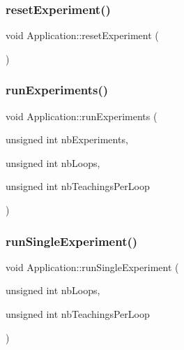 \subsubsection{\texorpdfstring{reset\+Experiment()}{resetExperiment()}}
{\footnotesize\ttfamily void Application\+::reset\+Experiment (\begin{DoxyParamCaption}{ }\end{DoxyParamCaption})}

\mbox{\label{classApplication_ad57005e2c8e096af66eca715a7c6a961}} 
\subsubsection{\texorpdfstring{run\+Experiments()}{runExperiments()}}
{\footnotesize\ttfamily void Application\+::run\+Experiments (\begin{DoxyParamCaption}\item[{unsigned int}]{nb\+Experiments,  }\item[{unsigned int}]{nb\+Loops,  }\item[{unsigned int}]{nb\+Teachings\+Per\+Loop }\end{DoxyParamCaption})}

\mbox{\label{classApplication_a57dbef541907f1d1436732afec051ac2}} 
\subsubsection{\texorpdfstring{run\+Single\+Experiment()}{runSingleExperiment()}}
{\footnotesize\ttfamily void Application\+::run\+Single\+Experiment (\begin{DoxyParamCaption}\item[{unsigned int}]{nb\+Loops,  }\item[{unsigned int}]{nb\+Teachings\+Per\+Loop }\end{DoxyParamCaption})}

\mbox{\label{classApplication_ae93c9eb1888c7b3bbab68aa5da50ce46}} 
